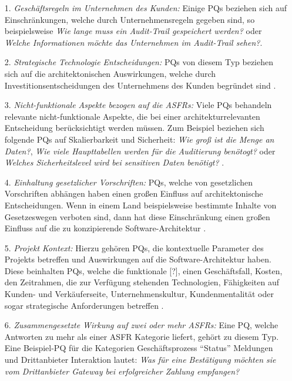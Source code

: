 \begin{itemize}
\item[1.] \textit{Gesch\"aftsregeln im Unternehmen des Kunden:} Einige PQs beziehen sich auf Einschr\"ankungen, welche durch Unternehmensregeln gegeben sind, so beispielsweise \textit{Wie lange muss ein Audit-Trail gespeichert werden?} oder \textit{Welche Informationen m\"ochte das Unternehmen im Audit-Trail sehen?}\cite{Ros02}.
\item[2.] \textit{Strategische Technologie Entscheidungen:} PQs von diesem Typ beziehen sich auf die architektonischen Auswirkungen, welche durch Investitionsentscheidungen des Unternehmens des Kunden begr\"undet sind \cite{Ros02}.
\item[3.] \textit{Nicht-funktionale Aspekte bezogen auf die ASFRs:} Viele PQs behandeln relevante nicht-funktionale Aspekte, die bei einer architekturrelevanten Entscheidung ber\"ucksichtigt werden m\"ussen. Zum Beispiel beziehen sich folgende PQs auf Skalierbarkeit und Sicherheit: \textit{Wie gro\ss{} ist die Menge an Daten?}, \textit{Wie viele Haupttabellen werden f\"ur die Auditierung ben\"otogt?} oder \textit{Welches Sicherheitslevel wird bei sensitiven Daten ben\"otigt?} \cite{Ros02}.
\item[4.] \textit{Einhaltung gesetzlicher Vorschriften:} PQs, welche von gesetzlichen Vorschriften abh\"angen haben einen gro\ss{}en Einfluss auf architektonische Entscheidungen. Wenn in einem Land beispielsweise bestimmte Inhalte von Gesetzeswegen verboten sind, dann hat diese Einschr\"ankung einen gro\ss{}en Einfluss auf die zu konzipierende Software-Architektur \cite{Ros02}.
\item[5.] \textit{Projekt Kontext:} Hierzu geh\"oren PQs, die kontextuelle Parameter des Projekts betreffen und Auswirkungen auf die Software-Architektur haben. Diese beinhalten PQs, welche die funktionale [?], einen Gesch\"aftsfall, Kosten, den Zeitrahmen, die zur Verf\"ugung stehenden Technologien, F\"ahigkeiten auf Kunden- und Verk\"auferseite, Unternehmenskultur, Kundenmentalit\"at oder sogar strategische Anforderungen betreffen \cite{Ros02}.
\item[6.] \textit{Zusammengesetzte Wirkung auf zwei oder mehr ASFRs:} Eine PQ, welche Antworten zu mehr als einer ASFR Kategorie liefert, geh\"ort zu diesem Typ. Eine Beispiel-PQ f\"ur die Kategorien Gesch\"aftsprozess  ``Status'' Meldungen und Drittanbieter Interaktion lautet: \textit{Was f\"ur eine Best\"atigung m\"ochten sie vom Drittanbieter Gateway bei erfolgreicher Zahlung empfangen?} \cite{Ros02} \\
\end{itemize}

